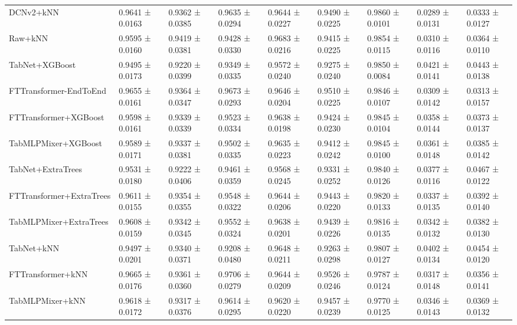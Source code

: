 \begin{table}
\begin{tabular}{lllllllll}
DCNv2+kNN & 0.9641 ± 0.0163 & 0.9362 ± 0.0385 & 0.9635 ± 0.0294 & 0.9644 ± 0.0227 & 0.9490 ± 0.0225 & 0.9860 ± 0.0101 & 0.0289 ± 0.0131 & 0.0333 ± 0.0127 \\
Raw+kNN & 0.9595 ± 0.0160 & 0.9419 ± 0.0381 & 0.9428 ± 0.0330 & 0.9683 ± 0.0216 & 0.9415 ± 0.0225 & 0.9854 ± 0.0115 & 0.0310 ± 0.0116 & 0.0364 ± 0.0110 \\
TabNet+XGBoost & 0.9495 ± 0.0173 & 0.9220 ± 0.0399 & 0.9349 ± 0.0335 & 0.9572 ± 0.0240 & 0.9275 ± 0.0240 & 0.9850 ± 0.0084 & 0.0421 ± 0.0141 & 0.0443 ± 0.0138 \\
FTTransformer-EndToEnd & 0.9655 ± 0.0161 & 0.9364 ± 0.0347 & 0.9673 ± 0.0293 & 0.9646 ± 0.0204 & 0.9510 ± 0.0225 & 0.9846 ± 0.0107 & 0.0309 ± 0.0142 & 0.0313 ± 0.0157 \\
FTTransformer+XGBoost & 0.9598 ± 0.0161 & 0.9339 ± 0.0339 & 0.9523 ± 0.0334 & 0.9638 ± 0.0198 & 0.9424 ± 0.0230 & 0.9845 ± 0.0104 & 0.0358 ± 0.0144 & 0.0373 ± 0.0137 \\
TabMLPMixer+XGBoost & 0.9589 ± 0.0171 & 0.9337 ± 0.0381 & 0.9502 ± 0.0335 & 0.9635 ± 0.0223 & 0.9412 ± 0.0242 & 0.9845 ± 0.0100 & 0.0361 ± 0.0148 & 0.0385 ± 0.0142 \\
TabNet+ExtraTrees & 0.9531 ± 0.0180 & 0.9222 ± 0.0406 & 0.9461 ± 0.0359 & 0.9568 ± 0.0245 & 0.9331 ± 0.0252 & 0.9840 ± 0.0126 & 0.0377 ± 0.0116 & 0.0467 ± 0.0122 \\
FTTransformer+ExtraTrees & 0.9611 ± 0.0155 & 0.9354 ± 0.0355 & 0.9548 ± 0.0322 & 0.9644 ± 0.0206 & 0.9443 ± 0.0220 & 0.9820 ± 0.0133 & 0.0337 ± 0.0135 & 0.0392 ± 0.0140 \\
TabMLPMixer+ExtraTrees & 0.9608 ± 0.0159 & 0.9342 ± 0.0345 & 0.9552 ± 0.0324 & 0.9638 ± 0.0201 & 0.9439 ± 0.0226 & 0.9816 ± 0.0135 & 0.0342 ± 0.0132 & 0.0382 ± 0.0130 \\
TabNet+kNN & 0.9497 ± 0.0201 & 0.9340 ± 0.0371 & 0.9208 ± 0.0480 & 0.9648 ± 0.0211 & 0.9263 ± 0.0298 & 0.9807 ± 0.0127 & 0.0402 ± 0.0134 & 0.0454 ± 0.0120 \\
FTTransformer+kNN & 0.9665 ± 0.0176 & 0.9361 ± 0.0360 & 0.9706 ± 0.0279 & 0.9644 ± 0.0209 & 0.9526 ± 0.0246 & 0.9787 ± 0.0124 & 0.0317 ± 0.0148 & 0.0356 ± 0.0141 \\
TabMLPMixer+kNN & 0.9618 ± 0.0172 & 0.9317 ± 0.0376 & 0.9614 ± 0.0295 & 0.9620 ± 0.0220 & 0.9457 ± 0.0239 & 0.9770 ± 0.0125 & 0.0346 ± 0.0143 & 0.0369 ± 0.0132 \\
\bottomrule
\end{tabular}
\end{table}


